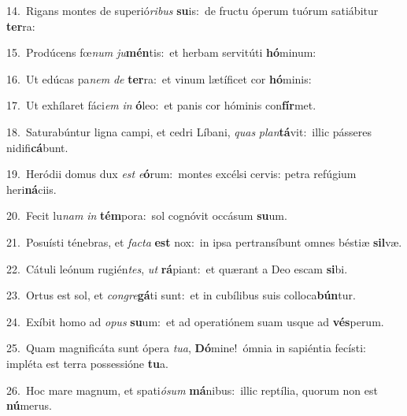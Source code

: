 {\numbfont\textcolor{\numbcolor}{14.}}~Rigans montes de superió\-\textit{ri}\-\textit{bus} \textbf{su}\-is:~\star de fructu óperum tuórum satiábitur \textbf{ter}\-ra:\par
{\numbfont\textcolor{\numbcolor}{15.}}~Prodúcens fœ\textit{num} \textit{ju}\-\textbf{mén}tis:~\star et herbam servitúti \textbf{hó}\-minum:\par
{\numbfont\textcolor{\numbcolor}{16.}}~Ut edúcas pa\textit{nem} \textit{de} \textbf{ter}\-ra:~\star et vinum lætíficet cor \textbf{hó}\-minis:\par
{\numbfont\textcolor{\numbcolor}{17.}}~Ut exhílaret fáci\textit{em} \textit{in} \textbf{ó}\-leo:~\star et panis cor hóminis con\-\textbf{fír}\-met.\par
{\numbfont\textcolor{\numbcolor}{18.}}~Saturabúntur ligna campi, et cedri Líbani, \textit{quas} \textit{plan}\-\textbf{tá}vit:~\star illic pásseres nidifi\-\textbf{cá}\-bunt.\par
{\numbfont\textcolor{\numbcolor}{19.}}~Heródii domus dux \textit{est} \textit{e}\-\textbf{ó}rum:~\star montes excélsi cervis: petra refúgium heri\-\textbf{ná}\-ciis.\par
{\numbfont\textcolor{\numbcolor}{20.}}~Fecit lu\textit{nam} \textit{in} \textbf{tém}\-pora:~\star sol cognóvit occásum \textbf{su}\-um.\par
{\numbfont\textcolor{\numbcolor}{21.}}~Posuísti ténebras, et \textit{fac}\-\textit{ta} \textbf{est} nox:~\star in ipsa pertransíbunt omnes béstiæ \textbf{sil}\-væ.\par
{\numbfont\textcolor{\numbcolor}{22.}}~Cátuli leónum rugién\-\textit{tes}\-, \textit{ut} \textbf{rá}\-piant:~\star et quærant a Deo escam \textbf{si}\-bi.\par
{\numbfont\textcolor{\numbcolor}{23.}}~Ortus est sol, et \textit{con}\-\textit{gre}\textbf{gá}ti sunt:~\star et in cubílibus suis colloca\-\textbf{bún}\-tur.\par
{\numbfont\textcolor{\numbcolor}{24.}}~Exíbit homo ad \textit{o}\-\textit{pus} \textbf{su}\-um:~\star et ad operatiónem suam usque ad \textbf{vés}\-perum.\par
{\numbfont\textcolor{\numbcolor}{25.}}~Quam magnificáta sunt ópera \textit{tu}\-\textit{a}, \textbf{Dó}\-mine!~\star ómnia in sapiéntia fecísti: impléta est terra possessióne \textbf{tu}\-a.\par
{\numbfont\textcolor{\numbcolor}{26.}}~Hoc mare magnum, et spati\-\textit{ó}\-\textit{sum} \textbf{má}\-nibus:~\star illic reptília, quorum non est \textbf{nú}\-merus.\par
